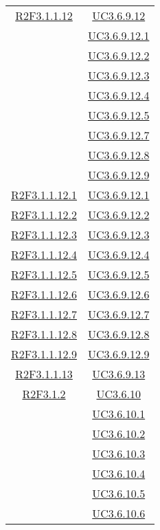 \begin{longtable}{|c|c|}
\hline
\hyperlink{R2F3.1.1.12}{R2F3.1.1.12} & \hyperlink{UC3.6.9.12}{UC3.6.9.12}\\
& \hyperlink{UC3.6.9.12.1}{UC3.6.9.12.1}\\
& \hyperlink{UC3.6.9.12.2}{UC3.6.9.12.2}\\
& \hyperlink{UC3.6.9.12.3}{UC3.6.9.12.3}\\
& \hyperlink{UC3.6.9.12.4}{UC3.6.9.12.4}\\
& \hyperlink{UC3.6.9.12.5}{UC3.6.9.12.5}\\
& \hyperlink{UC3.6.9.12.7}{UC3.6.9.12.7}\\
& \hyperlink{UC3.6.9.12.8}{UC3.6.9.12.8}\\
& \hyperlink{UC3.6.9.12.9}{UC3.6.9.12.9}\\
\hline
\hyperlink{R2F3.1.1.12.1}{R2F3.1.1.12.1} & \hyperlink{UC3.6.9.12.1}{UC3.6.9.12.1}\\
\hline
\hyperlink{R2F3.1.1.12.2}{R2F3.1.1.12.2} & \hyperlink{UC3.6.9.12.2}{UC3.6.9.12.2}\\
\hline
\hyperlink{R2F3.1.1.12.3}{R2F3.1.1.12.3} & \hyperlink{UC3.6.9.12.3}{UC3.6.9.12.3}\\
\hline
\hyperlink{R2F3.1.1.12.4}{R2F3.1.1.12.4} & \hyperlink{UC3.6.9.12.4}{UC3.6.9.12.4}\\
\hline
\hyperlink{R2F3.1.1.12.5}{R2F3.1.1.12.5} & \hyperlink{UC3.6.9.12.5}{UC3.6.9.12.5}\\
\hline
\hyperlink{R2F3.1.1.12.6}{R2F3.1.1.12.6} & \hyperlink{UC3.6.9.12.6}{UC3.6.9.12.6}\\
\hline
\hyperlink{R2F3.1.1.12.7}{R2F3.1.1.12.7} & \hyperlink{UC3.6.9.12.7}{UC3.6.9.12.7}\\
\hline
\hyperlink{R2F3.1.1.12.8}{R2F3.1.1.12.8} & \hyperlink{UC3.6.9.12.8}{UC3.6.9.12.8}\\
\hline
\hyperlink{R2F3.1.1.12.9}{R2F3.1.1.12.9} & \hyperlink{UC3.6.9.12.9}{UC3.6.9.12.9}\\
\hline
\hyperlink{R2F3.1.1.13}{R2F3.1.1.13} & \hyperlink{UC3.6.9.13}{UC3.6.9.13}\\
\hline
\hyperlink{R2F3.1.2}{R2F3.1.2} & \hyperlink{UC3.6.10}{UC3.6.10}\\
& \hyperlink{UC3.6.10.1}{UC3.6.10.1}\\
& \hyperlink{UC3.6.10.2}{UC3.6.10.2}\\
& \hyperlink{UC3.6.10.3}{UC3.6.10.3}\\
& \hyperlink{UC3.6.10.4}{UC3.6.10.4}\\
& \hyperlink{UC3.6.10.5}{UC3.6.10.5}\\
& \hyperlink{UC3.6.10.6}{UC3.6.10.6}\\

\end{longtable}
